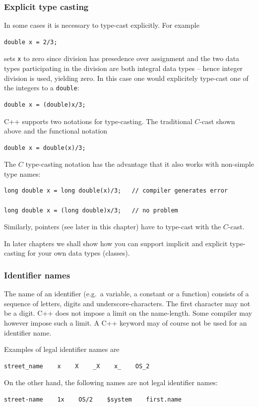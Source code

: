 \subsubsection{Explicit type casting}
In some cases it is necessary to type-cast explicitly. For example
{\small \begin{verbatim}
double x = 2/3;
\end{verbatim}}
\noindent
sets \verb+x+ to zero since division has presedence over assignment and the two data
types participating in the division are both integral data types -- hence integer division
is used, yielding zero. In this case one would explicitely type-cast one of the integers
to a \verb+double+:
{\small \begin{verbatim}
double x = (double)x/3;
\end{verbatim}}
\noindent
C++ supports two notations for type-casting. The traditional $C$-cast shown above and
the functional notation
{\small \begin{verbatim}
double x = double(x)/3;
\end{verbatim}}
The $C$ type-casting notation has the advantage that it also works with non-simple
type names:
{\small \begin{verbatim}
long double x = long double(x)/3;   // compiler generates error

long double x = (long double)x/3;   // no problem
\end{verbatim}}
Similarly, pointers (see later in this chapter) have to type-cast with the $C$-cast.

In later chapters we shall show how you can support implicit and explicit type-casting
for your own data types (classes).


\subsubsection{Identifier names}

The name of an identifier (e.g.\ a variable, a constant or a function) consists
of a sequence of letters, digits and underscore-characters. The first character
may not be a digit. C++ does not impose a limit on the name-length. Some
compiler may however impose such a limit. A C++ keyword may of course not
be used for an identifier name.

Examples of legal identifier names are
{\small \begin{verbatim}
street_name    x    X    _X    x_    OS_2
\end{verbatim}}
\noindent
On the other hand, the following names are not legal identifier names:
{\small \begin{verbatim}
street-name    1x    OS/2    $system    first.name
\end{verbatim}}


